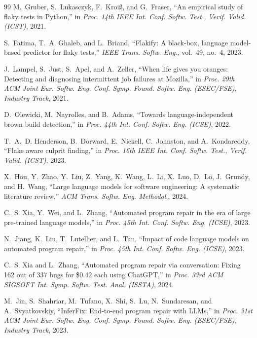 \documentclass[10pt,conference]{IEEEtran}
\begin{document}
\begin{thebibliography}{99}
M.~Gruber, S.~Lukasczyk, F.~Kroi{\ss}, and G.~Fraser, ``An empirical study of flaky tests in {Python},'' in \emph{Proc. 14th IEEE Int. Conf. Softw. Test., Verif. Valid. (ICST)}, 2021.

S.~Fatima, T.~A. Ghaleb, and L.~Briand, ``Flakify: A black-box, language model-based predictor for flaky tests,'' \emph{IEEE Trans. Softw. Eng.}, vol.~49, no.~4, 2023.

J.~Lampel, S.~Just, S.~Apel, and A.~Zeller, ``When life gives you oranges: Detecting and diagnosing intermittent job failures at {Mozilla},'' in \emph{Proc. 29th ACM Joint Eur. Softw. Eng. Conf. Symp. Found. Softw. Eng. (ESEC/FSE), Industry Track}, 2021.

D.~Olewicki, M.~Nayrolles, and B.~Adams, ``Towards language-independent brown build detection,'' in \emph{Proc. 44th Int. Conf. Softw. Eng. (ICSE)}, 2022.

T.~A.~D. Henderson, B.~Dorward, E.~Nickell, C.~Johnston, and A.~Kondareddy, ``Flake aware culprit finding,'' in \emph{Proc. 16th IEEE Int. Conf. Softw. Test., Verif. Valid. (ICST)}, 2023.

X.~Hou, Y.~Zhao, Y.~Liu, Z.~Yang, K.~Wang, L.~Li, X.~Luo, D.~Lo, J.~Grundy, and H.~Wang, ``Large language models for software engineering: A systematic literature review,'' \emph{ACM Trans. Softw. Eng. Methodol.}, 2024.

C.~S. Xia, Y.~Wei, and L.~Zhang, ``Automated program repair in the era of large pre-trained language models,'' in \emph{Proc. 45th Int. Conf. Softw. Eng. (ICSE)}, 2023.

N.~Jiang, K.~Liu, T.~Lutellier, and L.~Tan, ``Impact of code language models on automated program repair,'' in \emph{Proc. 45th Int. Conf. Softw. Eng. (ICSE)}, 2023.

C.~S. Xia and L.~Zhang, ``Automated program repair via conversation: Fixing 162 out of 337 bugs for \$0.42 each using {ChatGPT},'' in \emph{Proc. 33rd ACM SIGSOFT Int. Symp. Softw. Test. Anal. (ISSTA)}, 2024.

M.~Jin, S.~Shahriar, M.~Tufano, X.~Shi, S.~Lu, N.~Sundaresan, and A.~Svyatkovskiy, ``{InferFix}: End-to-end program repair with {LLMs},'' in \emph{Proc. 31st ACM Joint Eur. Softw. Eng. Conf. Symp. Found. Softw. Eng. (ESEC/FSE), Industry Track}, 2023.


\end{thebibliography}
\end{document}
